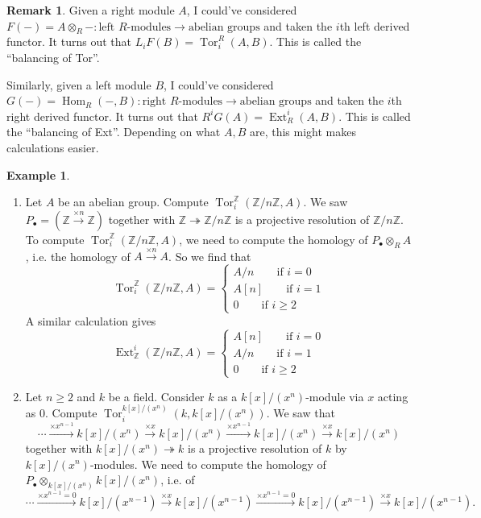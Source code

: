 \documentclass{article}
\newcommand{\Z}{\mathbb{Z}}
\newcommand{\Hom}{\operatorname{Hom}}
\newcommand{\Tor}{\operatorname{Tor}}
\newcommand{\Ext}{\operatorname{Ext}}
\theoremstyle{definition}
\newtheorem{example}[defn]{Example}
\newtheorem{remark}[defn]{Remark}
\begin{document}
\begin{remark}
Given a right module $A$, I could've considered $F(-)=A\otimes_R -:\text{left }R\text{-modules}\rightarrow\text{abelian groups}$ and taken the $i$th left derived functor. It turns out that $L_iF(B)=\Tor_i^R(A,B)$. This is called the ``balancing of Tor''.

Similarly, given a left module $B$, I could've considered $G(-)=\Hom_R(-,B):\text{right }R\text{-modules}\rightarrow\text{abelian groups}$ and taken the $i$th right derived functor. It turns out that $R^iG(A)=\Ext_R^i(A,B)$. This is called the ``balancing of Ext''. Depending on what $A,B$ are, this might makes calculations easier.
\end{remark}

\begin{example}
\label{example:ExtTor}
\begin{enumerate}
\item Let $A$ be an abelian group. Compute $\Tor_i^\Z(\Z/n\Z,A)$. We saw $P_\bullet=(\Z\xrightarrow{\times n}\Z)$ together with $\Z\twoheadrightarrow\Z/n\Z$ is a projective resolution of $\Z/n\Z$. To compute $\Tor_i^\Z(\Z/n\Z,A)$, we need to compute the homology of $P_\bullet\otimes_RA$, i.e. the homology of $A\xrightarrow{\times n}A$. So we find that
\[
\Tor_i^\Z(\Z/n\Z,A)=\left\{
\begin{aligned}
A/n\qquad \text{if }i=0 \\
A[n]\qquad\text{if }i=1 \\
0\qquad\text{if }i\geq 2
\end{aligned}
\right.
\]
A similar calculation gives
\[
\Ext_\Z^i(\Z/n\Z,A)=\left\{
\begin{aligned}
A[n]\qquad\text{if }i=0 \\
A/n\qquad\text{if }i=1 \\
0\qquad\text{if }i\geq 2
\end{aligned}
\right.
\]
\item Let $n\geq 2$ and $k$ be a field. Consider $k$ as a $k[x]/(x^n)$-module via $x$ acting as 0. Compute $\Tor_i^{k[x]/(x^n)}\left(k,k[x]/(x^n)\right)$. We saw that
\[
\cdots \xrightarrow{\times x^{n-1}} k[x]/(x^n) \xrightarrow{\times x} k[x]/(x^n) \xrightarrow{\times x^{n-1}} k[x]/(x^n) \xrightarrow{\times x} k[x]/(x^n)
\]
together with $k[x]/(x^n)\twoheadrightarrow k$ is a projective resolution of $k$ by $k[x]/(x^n)$-modules. We need to compute the homology of $P_\bullet\otimes_{k[x]/(x^n)}k[x]/(x^n)$, i.e. of
\[
\cdots \xrightarrow{\times x^{n-1}=0} k[x]/(x^{n-1}) \xrightarrow{\times x} k[x]/(x^{n-1}) \xrightarrow{\times x^{n-1}=0} k[x]/(x^{n-1}) \xrightarrow{\times x} k[x]/(x^{n-1}).
\]
\end{enumerate}
\end{example}
\end{document}
